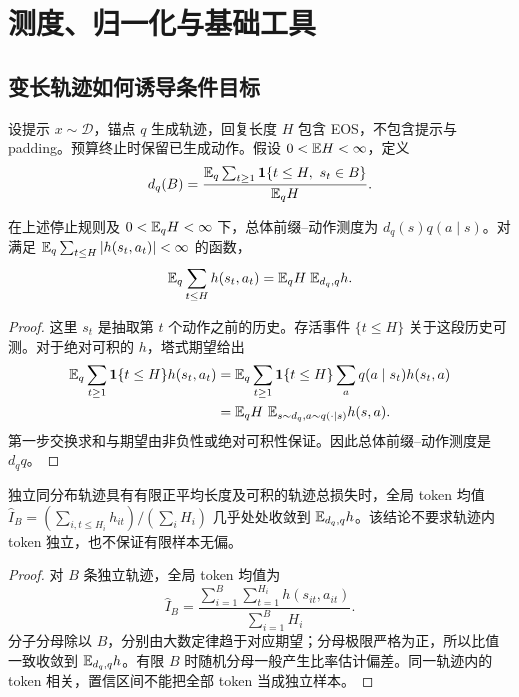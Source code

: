 \chapter{测度、归一化与基础工具}
\label{app:measure}
\section{变长轨迹如何诱导条件目标}
设提示 $x\sim\mathcal D$，锚点 $q$ 生成轨迹，回复长度 $H$ 包含 EOS，不包含提示与 padding。预算终止时保留已生成动作。假设 $0<\mathbb E H<\infty$，定义
\begin{equation}
d_q(B)=\frac{\E_q\sum_{t\ge1}\mathbf1\{t\le H,\ s_t\in B\}}{\E_qH}.
\end{equation}
\begin{proposition}[访问测度的条件分解]
在上述停止规则及 $0<\mathbb E_qH<\infty$ 下，总体前缀--动作测度为 $d_q(s)q(a\mid s)$。对满足 $\mathbb E_q\sum_{t\le H}|h(s_t,a_t)|<\infty$ 的函数，
\begin{equation}
\mathbb E_q\sum_{t\le H}h(s_t,a_t)=\mathbb E_qH\;\mathbb E_{d_q,q}h.
\end{equation}
\end{proposition}
\begin{proof}
这里 $s_t$ 是抽取第 $t$ 个动作之前的历史。存活事件 $\{t\le H\}$ 关于这段历史可测。对于绝对可积的 $h$，塔式期望给出
\begin{align}
\mathbb E_q\sum_{t\ge1}\mathbf1\{t\le H\}h(s_t,a_t)
&=\mathbb E_q\sum_{t\ge1}\mathbf1\{t\le H\}
\sum_aq(a\mid s_t)h(s_t,a)\\
&=\mathbb E_qH\ \mathbb E_{s\sim d_q,a\sim q(\cdot\mid s)}h(s,a).
\end{align}
第一步交换求和与期望由非负性或绝对可积性保证。因此总体前缀--动作测度是 $d_qq$。
\end{proof}

\begin{proposition}
独立同分布轨迹具有有限正平均长度及可积的轨迹总损失时，全局 token 均值
$\widehat I_B=(\sum_{i,t\le H_i}h_{it})/(\sum_iH_i)$ 几乎处处收敛到 $\mathbb E_{d_q,q}h$。该结论不要求轨迹内 token 独立，也不保证有限样本无偏。
\end{proposition}
\begin{proof}
对 $B$ 条独立轨迹，全局 token 均值为
\begin{equation}
\widehat I_B=\frac{\sum_{i=1}^B\sum_{t=1}^{H_i}h(s_{it},a_{it})}{\sum_{i=1}^BH_i}.
\end{equation}
分子分母除以 $B$，分别由大数定律趋于对应期望；分母极限严格为正，所以比值一致收敛到 $\mathbb E_{d_q,q}h$。有限 $B$ 时随机分母一般产生比率估计偏差。同一轨迹内的 token 相关，置信区间不能把全部 token 当成独立样本。
\end{proof}

